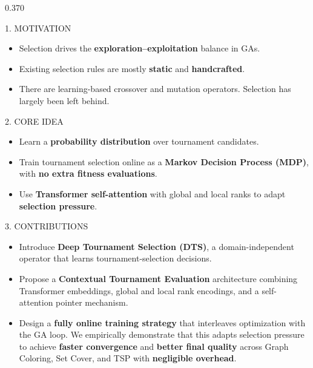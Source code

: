 \documentclass[final]{beamer}
\newcommand{\FSBody}{\fontsize{24.5}{30.5}\selectfont}   %
\newcommand{\PosterSectionGap}{0.10cm}
\newcommand{\sectiongap}{\vspace{\PosterSectionGap}}
\begin{document}
\begin{frame}[t]
\vspace{-0.8cm}

\begin{columns}[t,onlytextwidth]

\begin{column}{0.370\paperwidth}
\begin{secbox}{1. MOTIVATION}
\FSBody
\begin{itemize}\setlength\itemsep{2.5mm}
  \item Selection drives the \textbf{exploration--exploitation} balance in GAs.
  \item Existing selection rules are mostly \textbf{static} and \textbf{handcrafted}.
  \item There are learning-based crossover and mutation operators. Selection has largely been left behind.
\end{itemize}
\end{secbox}

\sectiongap

\begin{secbox}{2. CORE IDEA}
\FSBody
\begin{itemize}\setlength\itemsep{2.5mm}
  \item Learn a \textbf{probability distribution} over tournament candidates.
  \item Train tournament selection online as a \textbf{Markov Decision Process (MDP)}, with \textbf{no extra fitness evaluations}.
  \item Use \textbf{Transformer self-attention} with global and local ranks to adapt \textbf{selection pressure}.
\end{itemize}
\end{secbox}

\sectiongap

\begin{secbox}{3. CONTRIBUTIONS}
\FSBody
\begin{itemize}\setlength\itemsep{2.5mm}
  \item Introduce \textbf{Deep Tournament Selection (DTS)}, a domain-independent operator that learns tournament-selection decisions.
  \item Propose a \textbf{Contextual Tournament Evaluation} architecture combining Transformer embeddings, global and local rank encodings, and a self-attention pointer mechanism.
  \item Design a \textbf{fully online training strategy} that interleaves optimization with the GA loop. We empirically demonstrate that this adapts selection pressure to achieve \textbf{faster convergence} and \textbf{better final quality} across Graph Coloring, Set Cover, and TSP with \textbf{negligible overhead}.
\end{itemize}
\end{secbox}
\end{column}


\end{columns}
\end{frame}
\end{document}
